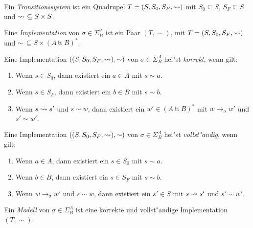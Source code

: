 \documentclass[12pt,a4paper]{article}
\begin{document}
\begin{definition}[Transitionssystem]
  Ein \emph{Transitionssystem} ist ein Quadrupel $T = (S, S_0, S_F, \rightsquigarrow)$ mit $S_0 \subseteq S$,
  $S_F \subseteq S$ und $\rightsquigarrow\ \subseteq S \times S$.
\end{definition}

\begin{definition}[Implementation]
  Eine \emph{Implementation} von $\sigma\in\Sigma^A_B$ ist ein Paar
  $(T,\sim)$, mit $T = (S,S_0,S_F,\rightsquigarrow)$ und $\sim\ \subseteq S \times (A \uplus B)^*$.
\end{definition}

\begin{definition}
  Eine Implementation $((S,S_0,S_F,\rightsquigarrow),\sim)$ von $\sigma \in \Sigma^A_B$ hei"st \emph{korrekt},
  wenn gilt:
  \begin{enumerate}
  \item Wenn $s \in S_0$, dann existiert ein $a \in A$ mit $s \sim a$.
  \item Wenn $s \in S_F$, dann existiert ein $b \in B$ mit $s \sim b$.
  \item Wenn $s \rightsquigarrow s'$ und $s \sim w$, dann existiert ein $w' \in (A \uplus B)^*$
    mit $w \to_\sigma w'$ und $s' \sim w'$.
  \end{enumerate}
\end{definition}

\begin{definition}
  Eine Implementation $((S,S_0,S_F,\rightsquigarrow),\sim)$ von $\sigma \in \Sigma^A_B$ hei"st \emph{vollst"andig},
  wenn gilt:
  \begin{enumerate}
  \item Wenn $a \in A$, dann existiert ein $s \in S_0$ mit $s \sim a$.
  \item Wenn $b \in B$, dann existiert ein $s \in S_F$ mit $s \sim b$.
  \item Wenn $w \to_\sigma w'$ und $s \sim w$, dann existiert ein $s' \in S$
    mit $s \rightsquigarrow s'$ und $s' \sim w'$.
  \end{enumerate}
\end{definition}

\begin{definition}[Modell]
  Ein \emph{Modell} von $\sigma \in \Sigma^A_B$ ist eine
  korrekte und vollst"andige Implementation $(T,\sim)$.
\end{definition}
\end{document}
